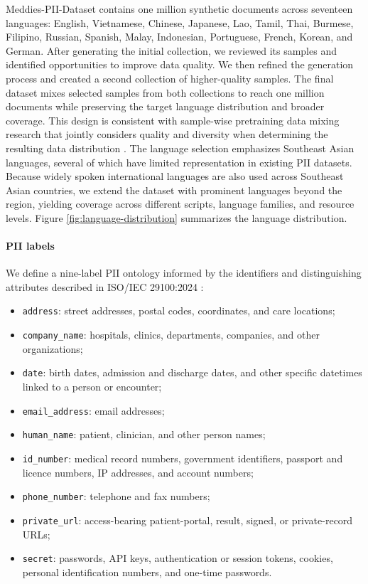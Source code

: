 \documentclass[11pt]{article}
\begin{document}
Meddies-PII-Dataset contains one million synthetic documents across seventeen languages: English, Vietnamese, Chinese, Japanese, Lao, Tamil, Thai, Burmese, Filipino, Russian, Spanish, Malay, Indonesian, Portuguese, French, Korean, and German. After generating the initial collection, we reviewed its samples and identified opportunities to improve data quality. We then refined the generation process and created a second collection of higher-quality samples. The final dataset mixes selected samples from both collections to reach one million documents while preserving the target language distribution and broader coverage. This design is consistent with sample-wise pretraining data mixing research that jointly considers quality and diversity when determining the resulting data distribution \cite{xi-etal-2025-samplemix}. The language selection emphasizes Southeast Asian languages, several of which have limited representation in existing PII datasets. Because widely spoken international languages are also used across Southeast Asian countries, we extend the dataset with prominent languages beyond the region, yielding coverage across different scripts, language families, and resource levels. Figure \ref{fig:language-distribution} summarizes the language distribution.

\paragraph{PII labels}

We define a nine-label PII ontology informed by the identifiers and distinguishing attributes described in ISO/IEC 29100:2024 \cite{iso29100-2024}:
\begin{itemize}
    \item \texttt{address}: street addresses, postal codes, coordinates, and care locations;
    \item \texttt{company\_name}: hospitals, clinics, departments, companies, and other organizations;
    \item \texttt{date}: birth dates, admission and discharge dates, and other specific datetimes linked to a person or encounter;
    \item \texttt{email\_address}: email addresses;
    \item \texttt{human\_name}: patient, clinician, and other person names;
    \item \texttt{id\_number}: medical record numbers, government identifiers, passport and licence numbers, IP addresses, and account numbers;
    \item \texttt{phone\_number}: telephone and fax numbers;
    \item \texttt{private\_url}: access-bearing patient-portal, result, signed, or private-record URLs;
    \item \texttt{secret}: passwords, API keys, authentication or session tokens, cookies, personal identification numbers, and one-time passwords.
\end{itemize}
\end{document}
